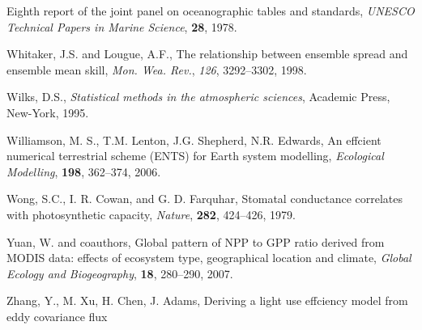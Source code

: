 \begin{thebibliography}{}
 Eighth report of the joint panel on oceanographic tables and standards,
 {\em UNESCO Technical Papers in Marine Science}, {\bf 28}, 1978.

 Whitaker, J.S. and  Lougue, A.F., The relationship between
 ensemble spread and ensemble mean skill, {\em Mon. Wea. Rev.},
 {\em 126}, 3292--3302, 1998.

 Wilks, D.S., {\it Statistical methods in the
 atmospheric sciences}, Academic Press, New-York, 1995.

 Williamson, M. S., T.M. Lenton, J.G. Shepherd, N.R. Edwards, An
 effcient numerical terrestrial scheme (ENTS) for Earth 
 system modelling,
 {\it Ecological Modelling}, {\bf 198}, 362--374, 2006.

 Wong, S.C., I. R. Cowan, and G. D. Farquhar, Stomatal conductance
 correlates with photosynthetic capacity,
 {\it Nature}, {\bf 282}, 424--426, 1979.

 Yuan, W. and coauthors,
 Global pattern of NPP to GPP ratio derived from MODIS data: effects of
 ecosystem type, geographical location
 and climate,  {\it Global Ecology and Biogeography},
 {\bf 18}, 280--290, 2007.

 Zhang, Y., M. Xu, H. Chen, J. Adams, 
 Deriving a light use effciency model from eddy covariance flux 

\end{thebibliography}
